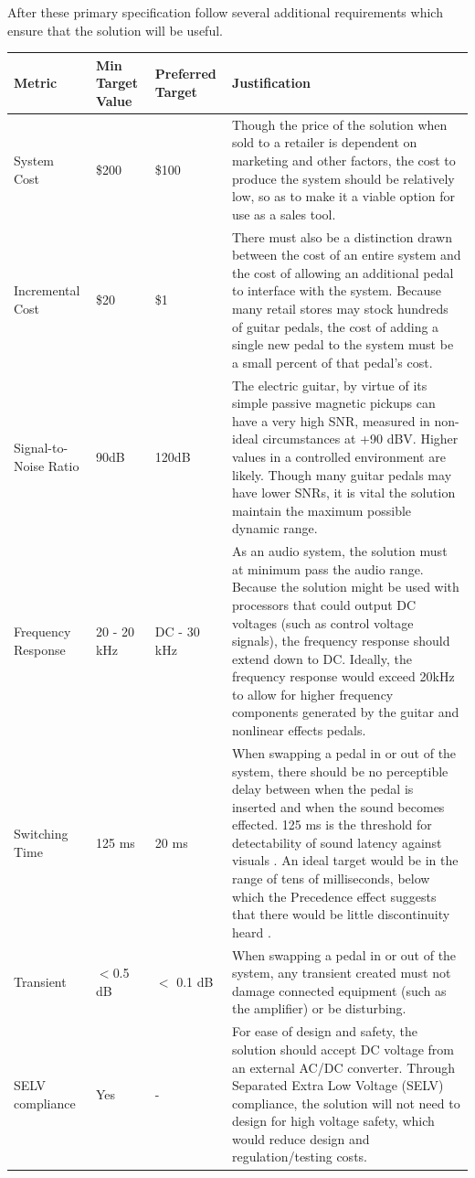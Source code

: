 \documentclass{article}
\begin{document}
	After these primary specification follow several additional requirements which ensure that the solution will be useful.

	\begin{center}
	\renewcommand{\arraystretch}{1.5}
	\begin{longtable}{|l|l|l|p{6cm}|}
		\hline
		Metric & Min Target Value & Preferred Target & Justification \\
		\hline
		System Cost & \$200 & \$100 & Though the price of the solution when sold to a retailer is dependent on marketing and other factors, the cost to produce the system should be relatively low, so as to make it a viable option for use as a sales tool. \\
		Incremental Cost & \$20 & \$1 & There must also be a distinction drawn between the cost of an entire system and the cost of allowing an additional pedal to interface with the system.  Because many retail stores may stock hundreds of guitar pedals, the cost of adding a single new pedal to the system must be a small percent of that pedal's cost. \\
		Signal-to-Noise Ratio & 90dB &  120dB & The electric guitar, by virtue of its simple passive magnetic pickups can have a very high SNR, measured in non-ideal circumstances at +90 dBV.  Higher values in a controlled environment are likely.  Though many guitar pedals may have lower SNRs, it is vital the solution maintain the maximum possible dynamic range. \\
		Frequency Response & 20 - 20 kHz & DC - 30 kHz & As an audio system, the solution must at minimum pass the audio range.  Because the solution might be used with processors that could output DC voltages (such as control voltage signals), the frequency response should extend down to DC.  Ideally, the frequency response would exceed 20kHz to allow for higher frequency components generated by the guitar and nonlinear effects pedals. \\
		Switching Time & 125 ms & 20 ms & When swapping a pedal in or out of the system, there should be no perceptible delay between when the pedal is inserted and when the sound becomes effected.  125 ms is the threshold for detectability of sound latency against visuals \cite{Timing}.  An ideal target would be in the range of tens of milliseconds, below which the Precedence effect suggests that there would be little discontinuity heard \cite{PrecedenceEffect}. \\
		Transient & $<$0.5 dB & $<$ 0.1 dB & When swapping a pedal in or out of the system, any transient created must not damage connected equipment (such as the amplifier) or be disturbing. \\
		SELV compliance	& Yes & - & For ease of design and safety, the solution should accept DC voltage from an external AC/DC converter.  Through Separated Extra Low Voltage (SELV) compliance, the solution will not need to design for high voltage safety, which would reduce design and regulation/testing costs. \\
		\hline
	\end{longtable}
	\end{center}
\end{document}
